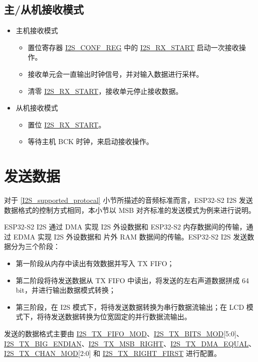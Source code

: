 \documentclass[main\_\_CN.tex]{subfiles}
\begin{document}
\subsection{主/从机接收模式}
\begin{itemize}
    \item 主机接收模式
    \begin{itemize}
        \item 置位寄存器 \hyperref[regdesc:I2SCONFREG]{I2S\_CONF\_REG} 中的 \hyperref[fielddesc:I2SRXSTART]{I2S\_RX\_START} 启动一次接收操作。
        \item 接收单元会一直输出时钟信号，并对输入数据进行采样。
        \item 清零 \hyperref[fielddesc:I2SRXSTART]{I2S\_RX\_START}，接收单元停止接收数据。
    \end{itemize}
    \item 从机接收模式
     \begin{itemize}
        \item 置位 \hyperref[fielddesc:I2SRXSTART]{I2S\_RX\_START}。
        \item 等待主机 BCK 时钟，来启动接收操作。
    \end{itemize}
\end{itemize}

\section{发送数据}\label{TXCHAN}

对于 \ref{I2S_supported_protocal} 小节所描述的音频标准而言，ESP32-S2 I2S 发送数据格式的控制方式相同，本小节以 MSB 对齐标准的发送模式为例来进行说明。

ESP32-S2 I2S 通过 DMA 实现 I2S 外设数据和 ESP32-S2 内存数据间的传输，通过 EDMA 实现 I2S 外设数据和 片外 RAM 数据间的传输。ESP32-S2 I2S 发送数据分为三个阶段：
\begin{itemize}
    \item 第一阶段从内存中读出有效数据并写入 TX FIFO；
    \item 第二阶段将待发送数据从 TX FIFO 中读出，将发送的左右声道数据拼成 64 bit，并进行输出数据模式转换；
    \item 第三阶段，在 I2S 模式下，将待发送数据转换为串行数据流输出；在 LCD
          模式下，将待发送数据转换为位宽固定的并行数据流输出。
\end{itemize}


发送的数据格式主要由 \hyperref[fielddesc:I2STXFIFOMOD]{I2S\_TX\_FIFO\_MOD}、\hyperref[fielddesc:I2STXBITSMOD]{I2S\_TX\_BITS\_MOD}[5:0]、\hyperref[fielddesc:I2STXBIGENDIAN]{I2S\_TX\_BIG\_ENDIAN}、\hyperref[fielddesc:I2STXMSBRIGHT]{I2S\_TX\_MSB\_RIGHT}、\hyperref[fielddesc:I2STXDMAEQUAL]{I2S\_TX\_DMA\_EQUAL}、\hyperref[fielddesc:I2STXCHANMOD]{I2S\_TX\_CHAN\_MOD}[2:0] 和 \hyperref[fielddesc:I2STXRIGHTFIRST]{I2S\_TX\_RIGHT\_FIRST} 进行配置。
\end{document}
